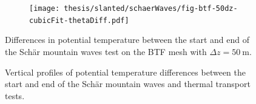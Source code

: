 \begin{figure}
	\centering
	\begin{subfigure}{\textwidth}
		\centering
		\texttt{[image: thesis/slanted/schaerWaves/fig-btf-50dz-cubicFit-thetaDiff.pdf]}
	\end{subfigure}
	\caption{Differences in potential temperature between the start and end of the Sch\"{a}r mountain waves test on the BTF mesh with $\Delta z = \SI{50}{\meter}$.  }
	\label{fig:slanted:schaerWaves:thetaDiff}
\end{figure}

\begin{figure}
	\caption{Vertical profiles of potential temperature differences between the start and end of the Sch\"{a}r mountain waves and thermal transport tests.  \TODO{}}
	\label{fig:slanted:sampleLines}
\end{figure}
